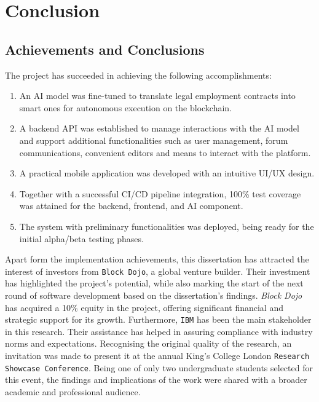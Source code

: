\chapter{Conclusion}

\section{Achievements and Conclusions}

The project has succeeded in achieving the following accomplishments:

\begin{enumerate}
    \item An AI model was fine-tuned to translate legal employment contracts into smart ones for autonomous execution on the blockchain.
    \item A backend API was established to manage interactions with the AI model and support additional functionalities such as user management, forum communications, convenient editors and means to interact with the platform.
    \item A practical mobile application was developed with an intuitive UI/UX design.
    \item Together with a successful CI/CD pipeline integration, 100\% test coverage was attained for the backend, frontend, and AI component.
    \item The system with preliminary functionalities was deployed, being ready for the initial alpha/beta testing phases.
\end{enumerate}

Apart form the implementation achievements, this dissertation has attracted the interest of investors from \texttt{Block Dojo}, a global venture builder. Their investment has highlighted the project's potential, while also marking the start of the next round of software development based on the dissertation's findings. \textit{Block Dojo} has acquired a 10\% equity in the project, offering significant financial and strategic support for its growth. Furthermore, \texttt{IBM} has been the main stakeholder in this research. Their assistance has helped in assuring compliance with industry norms and expectations. Recognising the original quality of the research, an invitation was made to present it at the annual King's College London \texttt{Research Showcase Conference}. Being one of only two undergraduate students selected for this event, the findings and implications of the work were shared with a broader academic and professional audience.

